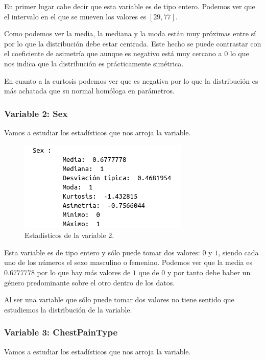 \documentclass[12pt,a4paper]{article}
\begin{document}
En primer lugar cabe decir que esta variable es de tipo entero. Podemos ver que el intervalo en el que se mueven los valores es $[29,77]$. 

Como podemos ver la media, la mediana y la moda están muy próximas entre sí por lo que la distribución debe estar centrada. Este hecho se puede contrastar con el coeficiente de asimetría que aunque es negativo está muy cercano a $0$ lo que nos indica que la distribución es prácticamente simétrica.

En cuanto a la curtosis podemos ver que es negativa por lo que la distribución es más achatada que su normal homóloga en parámetros.

\subsubsection*{Variable 2: Sex}

Vamos a estudiar los estadísticos que nos arroja la variable.

\begin{figure}[H]
	\centering
	\includegraphics[scale=0.7]{./Imagenes/EDA/Clasificacion/estadisticos_variable2.png}
	\caption{Estadísticos de la variable 2.}
\end{figure}

Esta variable es de tipo entero y sólo puede tomar dos valores: $0$ y $1$, siendo cada uno de los números el sexo masculino o femenino. Podemos ver que la media es $0.6777778$ por lo que hay más valores de $1$ que de $0$ y por tanto debe haber un género predominante sobre el otro dentro de los datos.

Al ser una variable que sólo puede tomar dos valores no tiene sentido que estudiemos la distribución de la variable.

\subsubsection*{Variable 3: ChestPainType}

Vamos a estudiar los estadísticos que nos arroja la variable.
\end{document}
